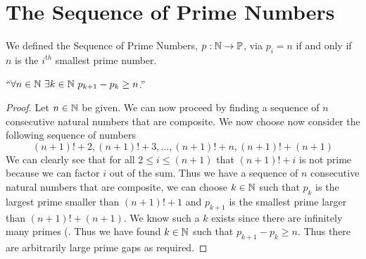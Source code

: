     \section{The Sequence of Prime Numbers}
        \begin{definition}
            We defined the Sequence of Prime Numbers, $p: \mathbb{N} \rightarrow \mathbb{P}$, via
            $p_i = n$ if and only if $n$ is the $i^{th}$ smallest prime number.
        \end{definition}
        \begin{theorem}
            $``\forall n \in \mathbb{N} \ \exists k \in \mathbb{N} \ p_{k + 1} - p_{k} \ge n$.''
        \end{theorem}
        \begin{proof}
            Let $n \in \mathbb{N}$ be given. We can now proceed by finding a sequence of $n$ consecutive
            natural numbers that are composite. We now choose now consider the following sequence of
            numbers
            \[
                (n + 1)! + 2, (n + 1)! + 3, \dots, (n + 1)! + n, (n + 1)! + (n + 1)
            \]
            We can clearly see that for all $2 \le i \le (n + 1)$ that $(n + 1)! + i$
            is not prime because we can factor $i$ out of the sum. Thus we have a sequence of $n$
            consecutive natural numbers that are composite, we can choose $k \in \mathbb{N}$ such
            that $p_k$ is the largest prime smaller than $(n + 1)! + 1$ and $p_{k + 1}$ is the
            smallest prime larger than $(n + 1)! + (n + 1)$. We know such a $k$ exists since there
            are infinitely many primes (. Thus we have found
            $k \in \mathbb{N}$ such that $p_{k + 1} - p_k \ge n$. Thus there are arbitrarily large
            prime gaps as required. \QED
        \end{proof}
